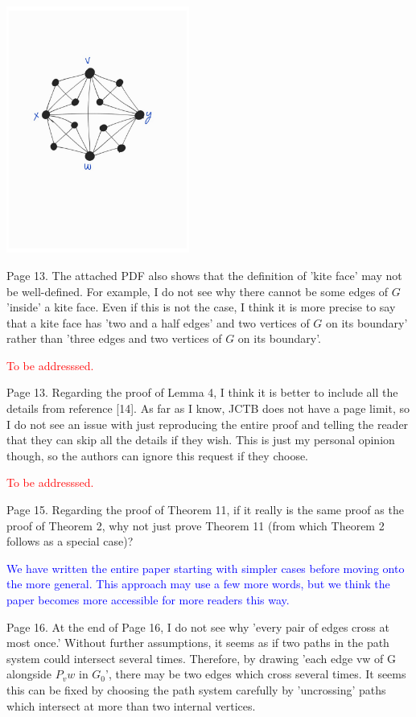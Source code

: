 \documentclass[12pt]{article}
\newcommand{\tba}{\textcolor{red}{To be addresssed.}}
\begin{document}
\includegraphics[width=60mm]{kite}

Page 13. The attached PDF also shows that the definition of 'kite
face' may not be well-defined.  For example, I do not see why there
cannot be some edges of $G$ 'inside' a kite face.  Even if this is not
the case, I think it is more precise to say that a kite face has 'two
and a half edges' and two vertices of $G$ on its boundary' rather than
'three edges and two vertices of $G$ on its boundary'.

\tba

Page 13.  Regarding the proof of Lemma 4, I think it is better to
include all the details from reference [14].  As far as I know, JCTB
does not have a page limit, so I do not see an issue with just
reproducing the entire proof and telling the reader that they can skip
all the details if they wish.  This is just my personal opinion
though, so the authors can ignore this request if they choose.

\tba

Page 15. Regarding the proof of Theorem 11, if it really is the same
proof as the proof of Theorem 2, why not just prove Theorem 11 (from
which Theorem 2 follows as a special case)?

\textcolor{blue}{We have written the entire paper starting with simpler cases before moving onto the more general. This approach may use a few more words, but we think the paper becomes more accessible for more readers this way.}

Page 16.  At the end of Page 16, I do not see why 'every pair of edges
cross at most once.'  Without further assumptions, it seems as if two
paths in the path system could intersect several times.  Therefore, by
drawing 'each edge vw of G alongside $P_vw$ in $G_0$', there may be two
edges which cross several times.  It seems this can be fixed by
choosing the path system carefully by 'uncrossing' paths which
intersect at more than two internal vertices.
\end{document}
